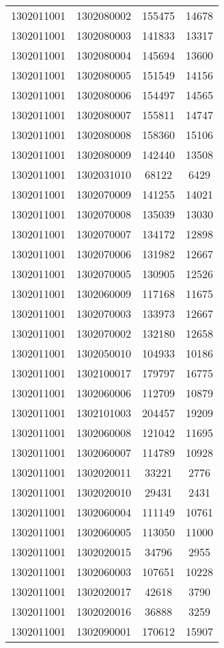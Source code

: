 \begin{longtable}{llcc}
1302011001 & 1302080002 & 155475 & 14678\\
1302011001 & 1302080003 & 141833 & 13317\\
1302011001 & 1302080004 & 145694 & 13600\\
1302011001 & 1302080005 & 151549 & 14156\\
1302011001 & 1302080006 & 154497 & 14565\\
1302011001 & 1302080007 & 155811 & 14747\\
1302011001 & 1302080008 & 158360 & 15106\\
1302011001 & 1302080009 & 142440 & 13508\\
1302011001 & 1302031010 & 68122 & 6429\\
1302011001 & 1302070009 & 141255 & 14021\\
1302011001 & 1302070008 & 135039 & 13030\\
1302011001 & 1302070007 & 134172 & 12898\\
1302011001 & 1302070006 & 131982 & 12667\\
1302011001 & 1302070005 & 130905 & 12526\\
1302011001 & 1302060009 & 117168 & 11675\\
1302011001 & 1302070003 & 133973 & 12667\\
1302011001 & 1302070002 & 132180 & 12658\\
1302011001 & 1302050010 & 104933 & 10186\\
1302011001 & 1302100017 & 179797 & 16775\\
1302011001 & 1302060006 & 112709 & 10879\\
1302011001 & 1302101003 & 204457 & 19209\\
1302011001 & 1302060008 & 121042 & 11695\\
1302011001 & 1302060007 & 114789 & 10928\\
1302011001 & 1302020011 & 33221 & 2776\\
1302011001 & 1302020010 & 29431 & 2431\\
1302011001 & 1302060004 & 111149 & 10761\\
1302011001 & 1302060005 & 113050 & 11000\\
1302011001 & 1302020015 & 34796 & 2955\\
1302011001 & 1302060003 & 107651 & 10228\\
1302011001 & 1302020017 & 42618 & 3790\\
1302011001 & 1302020016 & 36888 & 3259\\
1302011001 & 1302090001 & 170612 & 15907\\

\end{longtable}
